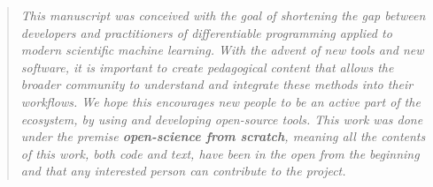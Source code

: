 \begin{quote}
    \textit{This manuscript was conceived with the goal of shortening the gap between developers and practitioners of differentiable programming applied to modern scientific machine learning. 
    With the advent of new tools and new software, it is important to create pedagogical content that allows the broader community to understand and integrate these methods into their workflows. 
    We hope this encourages new people to be an active part of the ecosystem, by using and developing open-source tools. 
    This work was done under the premise \textbf{open-science from scratch}, meaning all the contents of this work, both code and text, have been in the open from the beginning and that any interested person can contribute to the project. 
    }
\end{quote}